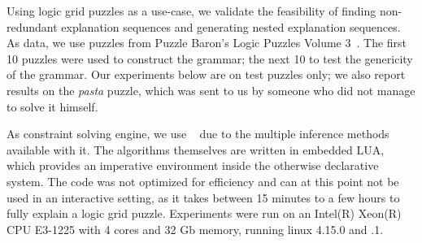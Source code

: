 Using logic grid puzzles as a use-case, we validate the feasibility of finding non-redundant explanation sequences and generating nested explanation sequences.
As data, we use puzzles from Puzzle Baron’s Logic Puzzles Volume 3~\cite{logigrammen}.
The first 10 puzzles were used to construct the grammar; the next 10 to test the genericity of the grammar.
Our experiments below are on test puzzles only; we also report results on the \textit{pasta} puzzle, which was sent to us by someone who did not manage to solve it himself.

As constraint solving engine, we use \idp~\cite{IDP} due to the multiple inference methods available with it.
The algorithms themselves are written in embedded LUA, which provides an imperative environment inside the otherwise declarative \idp system.
The code was not optimized for efficiency and can at this point not be used in an interactive setting, as it takes between 15 minutes to a few hours to fully explain a logic grid puzzle.
Experiments were run on an Intel(R) Xeon(R) CPU E3-1225 with 4 cores and 32 Gb memory, running linux 4.15.0 and .1.



 

